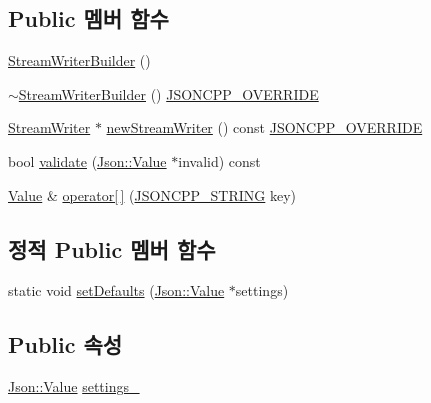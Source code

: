 \subsection*{Public 멤버 함수}
\begin{DoxyCompactItemize}
\item 
\hyperlink{class_json_1_1_stream_writer_builder_ab95b76179c152673ad14abc639a46ee4}{Stream\+Writer\+Builder} ()
\item 
\hyperlink{class_json_1_1_stream_writer_builder_a93263f8ef1e2d22593907075d8f0aaef}{$\sim$\+Stream\+Writer\+Builder} () \hyperlink{json_8h_a824d6199c91488107e443226fa6022c5}{J\+S\+O\+N\+C\+P\+P\+\_\+\+O\+V\+E\+R\+R\+I\+DE}
\item 
\hyperlink{class_json_1_1_stream_writer}{Stream\+Writer} $\ast$ \hyperlink{class_json_1_1_stream_writer_builder_ab9ee278609f88ae04a7c1a84e1f559e6}{new\+Stream\+Writer} () const \hyperlink{json_8h_a824d6199c91488107e443226fa6022c5}{J\+S\+O\+N\+C\+P\+P\+\_\+\+O\+V\+E\+R\+R\+I\+DE}
\item 
bool \hyperlink{class_json_1_1_stream_writer_builder_a12353b97766841db7d049da84658da09}{validate} (\hyperlink{class_json_1_1_value}{Json\+::\+Value} $\ast$invalid) const
\item 
\hyperlink{class_json_1_1_value}{Value} \& \hyperlink{class_json_1_1_stream_writer_builder_af68f6b59cb20b074052ed12bb3d336a3}{operator\mbox{[}$\,$\mbox{]}} (\hyperlink{json_8h_a1e723f95759de062585bc4a8fd3fa4be}{J\+S\+O\+N\+C\+P\+P\+\_\+\+S\+T\+R\+I\+NG} key)
\end{DoxyCompactItemize}
\subsection*{정적 Public 멤버 함수}
\begin{DoxyCompactItemize}
\item 
static void \hyperlink{class_json_1_1_stream_writer_builder_a53bf106b141e28637b01ad0ecd2acbf6}{set\+Defaults} (\hyperlink{class_json_1_1_value}{Json\+::\+Value} $\ast$settings)
\end{DoxyCompactItemize}
\subsection*{Public 속성}
\begin{DoxyCompactItemize}
\item 
\hyperlink{class_json_1_1_value}{Json\+::\+Value} \hyperlink{class_json_1_1_stream_writer_builder_a79bdf2e639a52f4e758c0b95bd1d3423}{settings\+\_\+}
\end{DoxyCompactItemize}


